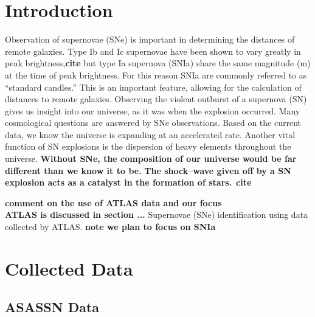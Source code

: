 \documentclass[aps,prb,twocolumn,superscriptaddress]{revtex4-1}
\begin{document}
\section{Introduction}
Observation of supernovae (SNe) is important in determining the distances 
of remote galaxies.  
Type Ib and Ic supernovae have been shown to vary greatly in peak brightness,{\bf cite} 
but type Ia supernova (SNIa) share the same magnitude (m) at the time of peak brightness.  
For this reason SNIa are commonly referred to as ``standard candles.''  This is 
an important feature, allowing for the calculation of distances to remote galaxies.  
Observing the violent outburst of a supernova (SN) gives us insight into our universe, 
as it was when the explosion occurred.  
Many cosmological questions are answered by SNe observations.  Based on the current 
data, we know the universe is expanding at an accelerated rate.  Another vital 
function of SN explosions is the dispersion of heavy elements throughout the universe.  
{\bf Without SNe, the composition of our universe would be far different than we know it to be.}
{\bf The shock--wave given off by a SN explosion acts as a catalyst in the formation of stars.}~{\bf cite}


{\bf comment on the use of ATLAS data and our focus\\ATLAS is discussed in section ...}
Supernovae (SNe) identification using data collected by ATLAS.
{\bf note we plan to focus on SNIa}






\section{Collected Data}

\subsection{ASASSN Data}
\end{document}
